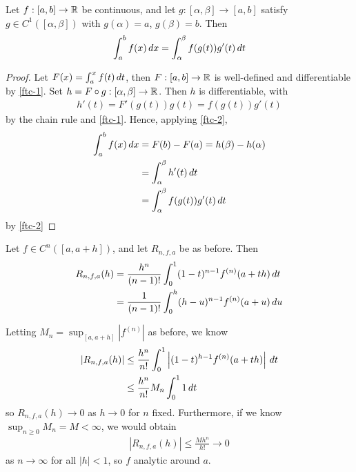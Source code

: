 \documentclass{../template/note}
\begin{document}
    \begin{proposition}
        Let \(f: [a, b] \to \mathbb R\) be continuous, and let \(g: [\alpha, \beta] \to [a, b]\) satisfy \(g \in C^1([\alpha, \beta])\) with \(g(\alpha) = a\), \(g(\beta) = b\). Then
        \begin{align*}
            \int_a^b f(x) \,d{x} = \int_\alpha^\beta f(g(t)) g'(t) \,d{t}
        \end{align*}
    \end{proposition}
    
    \begin{proof}
        Let \(F(x) = \int_a^x f(t) \,d{t}\), then \(F: [a, b] \to \mathbb R\) is well-defined and differentiable by \cref{ftc-1}. Set \(h = F \circ g: [\alpha, \beta] \to \mathbb R\). Then \(h\) is differentiable, with
        \begin{align*}
            h'(t) = F'(g(t))g(t) = f(g(t))g'(t)
        \end{align*}
        by the chain rule and \cref{ftc-1}. Hence, applying \cref{ftc-2},
        \begin{align*}
            \int_a^b f(x) \,d{x} &= F(b) - F(a) = h(\beta) - h(\alpha) \\
            &= \int_\alpha^\beta h'(t) \,d{t} \\
            &= \int_\alpha^\beta f(g(t)) g'(t) \,d{t}
        \end{align*}
        by \cref{ftc-2}
    \end{proof}
    
    \begin{theorem}
        Let \(f \in C^n([a, a+h])\), and let \(R_{n,f,a}\) be as before. Then
        \begin{align*}
            R_{n,f,a}(h) &= \frac{h^n}{(n-1)!} \int_0^1 (1-t)^{n-1}f^{(n)}(a+th) \,d{t} \\
            &= \frac 1 {(n-1)!} \int_0^h (h-u)^{n-1} f^{(n)}(a+u) \,d{u}
        \end{align*}
    \end{theorem}
    
    \begin{remark*}
        Letting \(M_n = \sup_{[a,a+h]}|f^{(n)}|\) as before, we know
        \begin{align*}
            \left|R_{n,f,a}(h)\right| &\leq \frac{h^n}{n!} \int_0^1 \left|(1-t)^{h-1} f^{(n)}(a+th)\right| \,d{t} \\
            &\leq \frac{h^n}{n!} M_n \int_0^1 1 \,d{t}
        \end{align*}
        so \(R_{n,f,a}(h) \to 0\) as \(h \to 0\) for \(n\) fixed. Furthermore, if we know \(\sup_{n \geq 0} M_n = M < \infty\), we would obtain
        \begin{align*}
            |R_{n,f,a}(h)| \leq \frac{Mh^n}{h!} \to 0
        \end{align*}
        as \(n \to \infty\) for all \(|h| < 1\), so \(f\) analytic around \(a\).       
    \end{remark*}
    
\end{document}
